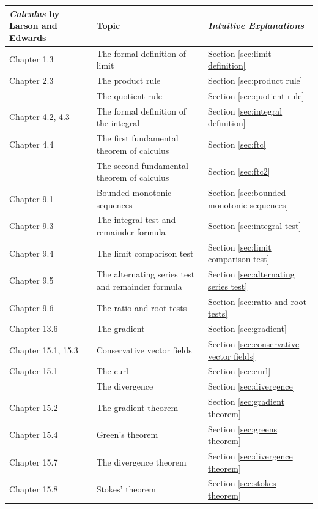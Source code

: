 \documentclass{myarticle}
\theoremstyle{nospace}
\newtheorem{old series theorem}{Theorem}
\newenvironment{series theorem}{\begin{mdframed}\begin{old series theorem}}{\end{old series theorem}\end{mdframed}}
\begin{document}
\begin{longtable}{P{0.2\textwidth}P{0.4\textwidth}P{0.3\textwidth}}
\toprule
\textit{Calculus} by Larson and Edwards & Topic & \textit{Intuitive Explanations} \\
\midrule
Chapter 1.3 & The formal definition of limit & Section \ref{sec:limit definition} \\
Chapter 2.3 & The product rule & Section \ref{sec:product rule} \\
& The quotient rule & Section \ref{sec:quotient rule} \\
Chapter 4.2, 4.3 & The formal definition of the integral & Section \ref{sec:integral definition} \\
Chapter 4.4 & The first fundamental theorem of calculus & Section \ref{sec:ftc} \\
& The second fundamental theorem of calculus & Section \ref{sec:ftc2} \\
Chapter 9.1 & Bounded monotonic sequences & Section \ref{sec:bounded monotonic sequences} \\
Chapter 9.3 & The integral test and remainder formula & Section \ref{sec:integral test} \\
Chapter 9.4 & The limit comparison test & Section \ref{sec:limit comparison test} \\
Chapter 9.5 & The alternating series test and remainder formula & Section \ref{sec:alternating series test} \\
Chapter 9.6 & The ratio and root tests & Section \ref{sec:ratio and root tests} \\
Chapter 13.6 & The gradient & Section \ref{sec:gradient} \\
Chapter 15.1, 15.3 & Conservative vector fields & Section \ref{sec:conservative vector fields} \\
Chapter 15.1 & The curl & Section \ref{sec:curl} \\
& The divergence & Section \ref{sec:divergence} \\
Chapter 15.2 & The gradient theorem & Section \ref{sec:gradient theorem} \\
Chapter 15.4 & Green's theorem & Section \ref{sec:greens theorem} \\
Chapter 15.7 & The divergence theorem & Section \ref{sec:divergence theorem} \\
Chapter 15.8 & Stokes' theorem & Section \ref{sec:stokes theorem} \\
\bottomrule
\end{longtable}
\end{document}
